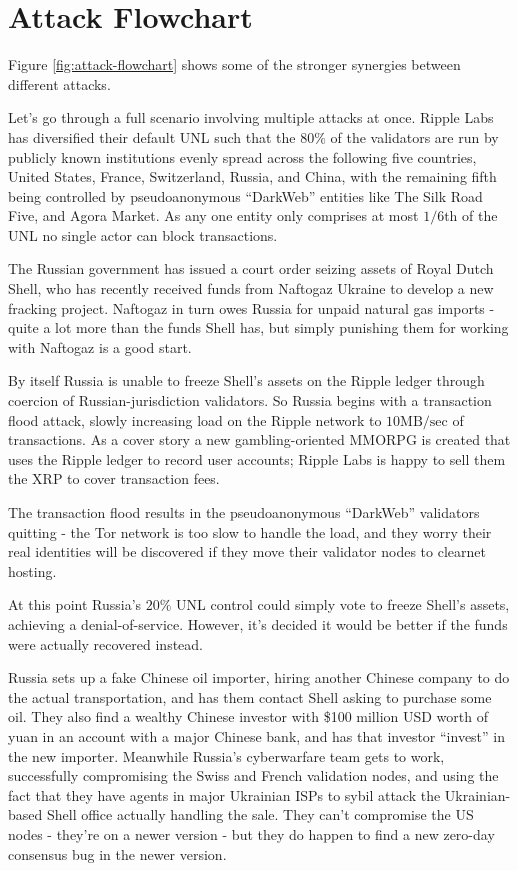 \documentclass{article}
\begin{document}
\begin{itemize}
\end{itemize}


\section{Attack Flowchart}

Figure \ref{fig:attack-flowchart} shows some of the stronger synergies between
different attacks.

Let's go through a full scenario involving multiple attacks at once.  Ripple
Labs has diversified their default UNL such that the $80\%$ of the validators
are run by publicly known institutions evenly spread across the following five
countries, United States, France, Switzerland, Russia, and China, with the
remaining fifth being controlled by pseudoanonymous ``DarkWeb'' entities like
The Silk Road Five, and Agora Market. As any one entity only comprises at most
$1/6\text{th}$ of the UNL no single actor can block transactions.

The Russian government has issued a court order seizing assets of Royal Dutch
Shell, who has recently received funds from Naftogaz Ukraine to develop a new
fracking project. Naftogaz in turn owes Russia for unpaid natural gas imports -
quite a lot more than the funds Shell has, but simply punishing them for
working with Naftogaz is a good start.

By itself Russia is unable to freeze Shell's assets on the Ripple ledger
through coercion of Russian-jurisdiction validators. So Russia begins with a
transaction flood attack, slowly increasing load on the Ripple network to
$10\text{MB}/\text{sec}$ of transactions. As a cover story a new
gambling-oriented MMORPG is created that uses the Ripple ledger to record user
accounts; Ripple Labs is happy to sell them the XRP to cover transaction fees.

The transaction flood results in the pseudoanonymous ``DarkWeb'' validators
quitting - the Tor network is too slow to handle the load, and they worry
their real identities will be discovered if they move their validator nodes
to clearnet hosting.

At this point Russia's $20\%$ UNL control could simply vote to freeze Shell's
assets, achieving a denial-of-service. However, it's decided it would be better
if the funds were actually recovered instead.

Russia sets up a fake Chinese oil importer, hiring another Chinese company to
do the actual transportation, and has them contact Shell asking to purchase
some oil. They also find a wealthy Chinese investor with \$100 million USD
worth of yuan in an account with a major Chinese bank, and has that investor
``invest'' in the new importer. Meanwhile Russia's cyberwarfare team gets to
work, successfully compromising the Swiss and French validation nodes, and
using the fact that they have agents in major Ukrainian ISPs to sybil attack
the Ukrainian-based Shell office actually handling the sale. They can't
compromise the US nodes - they're on a newer version - but they do happen to
find a new zero-day consensus bug in the newer version.
\end{document}
